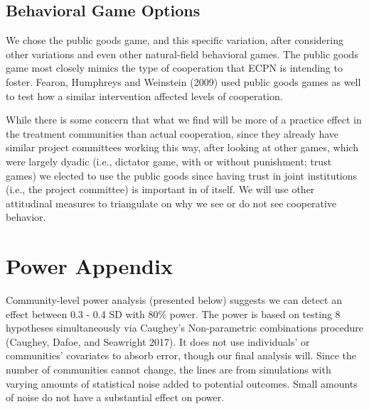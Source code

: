 \documentclass[
]{article}
\begin{document}
\hypertarget{behavioral-game-options}{%
\subsection{Behavioral Game Options}\label{behavioral-game-options}}

We chose the public goods game, and this specific variation, after
considering other variations and even other natural-field behavioral
games. The public goods game most closely mimics the type of cooperation
that ECPN is intending to foster. Fearon, Humphreys and Weinstein (2009)
used public goods games as well to test how a similar intervention
affected levels of cooperation.

While there is some concern that what we find will be more of a practice
effect in the treatment communities than actual cooperation, since they
already have similar project committees working this way, after looking
at other games, which were largely dyadic (i.e., dictator game, with or
without punishment; trust games) we elected to use the public goods
since having trust in joint institutions (i.e., the project committee)
is important in of itself. We will use other attitudinal measures to
triangulate on why we see or do not see cooperative behavior.

\hypertarget{power-appendix}{%
\section{Power Appendix}\label{power-appendix}}

Community-level power analysis (presented below) suggests we can detect
an effect between 0.3 - 0.4 SD with 80\% power. The power is based on
testing 8 hypotheses simultaneously via Caughey's Non-parametric
combinations procedure (Caughey, Dafoe, and Seawright 2017). It does not
use individuals' or communities' covariates to absorb error, though our
final analysis will. Since the number of communities cannot change, the
lines are from simulations with varying amounts of statistical noise
added to potential outcomes. Small amounts of noise do not have a
substantial effect on power.
\end{document}
